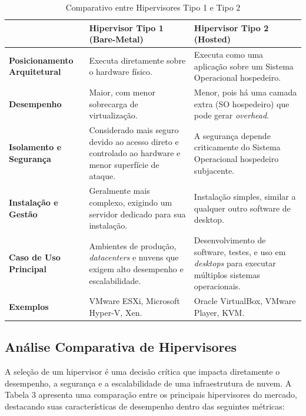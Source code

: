 \begin{table}[htb]
    \centering
    \caption{Comparativo entre Hipervisores Tipo 1 e Tipo 2}
    \label{tab:comparativo_hipervisores}
    \begin{tabularx}{\textwidth}{ >{\bfseries}l >{\RaggedRight}X >{\RaggedRight}X }
        \toprule
        & \textbf{Hipervisor Tipo 1 (Bare-Metal)} & \textbf{Hipervisor Tipo 2 (Hosted)} \\
        \midrule
        Posicionamento Arquitetural & Executa diretamente sobre o hardware físico. & Executa como uma aplicação sobre um Sistema Operacional hospedeiro. \\
        \addlinespace
        Desempenho & Maior, com menor sobrecarga de virtualização. & Menor, pois há uma camada extra (SO hospedeiro) que pode gerar \textit{overhead}. \\
        \addlinespace
        Isolamento e Segurança & Considerado mais seguro devido ao acesso direto e controlado ao hardware e menor superfície de ataque. & A segurança depende criticamente do Sistema Operacional hospedeiro subjacente. \\
        \addlinespace
        Instalação e Gestão & Geralmente mais complexo, exigindo um servidor dedicado para sua instalação. & Instalação simples, similar a qualquer outro software de desktop. \\
        \addlinespace
        Caso de Uso Principal & Ambientes de produção, \textit{datacenters} e nuvens que exigem alto desempenho e escalabilidade. & Desenvolvimento de software, testes, e uso em \textit{desktops} para executar múltiplos sistemas operacionais. \\
        \addlinespace
        Exemplos & VMware ESXi, Microsoft Hyper-V, Xen. & Oracle VirtualBox, VMware Player, KVM. \\
        \bottomrule
    \end{tabularx}
\end{table}


\subsection{Análise Comparativa de Hipervisores}
A seleção de um hipervisor é uma decisão crítica que impacta diretamente o desempenho, a segurança e a escalabilidade de uma infraestrutura de nuvem. A Tabela 3 apresenta uma comparação entre os principais hipervisores do mercado, destacando suas características de desempenho dentro das seguintes métricas:

